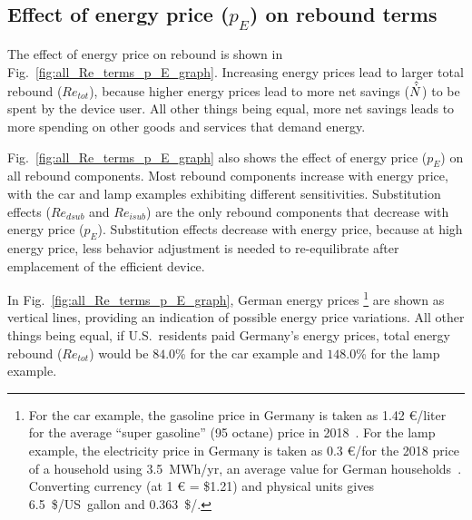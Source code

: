 \documentclass[12pt]{article}\usepackage[]{graphicx}\usepackage[]{xcolor}
\begin{document}
\subsection{Effect of energy price ($p_E$) on rebound terms} 
\label{sec:effect_of_energy_price}




The effect of energy price on rebound is shown in Fig.~\ref{fig:all_Re_terms_p_E_graph}.
Increasing energy prices lead to larger total rebound ($Re_{tot}$),
because higher energy prices lead to more net savings ($\hat{\dot{N}}$)
to be spent by the device user.
All other things being equal, more net savings leads to 
more spending on other goods and services that demand energy.

Fig.~\ref{fig:all_Re_terms_p_E_graph} also 
shows the effect of energy price ($p_E$)
on all rebound components.
Most rebound components increase with energy price, 
with the car and lamp examples exhibiting different sensitivities. 
Substitution effects ($Re_{dsub}$ and $Re_{isub}$)
are the only rebound components that decrease with energy price ($p_E$).
Substitution effects decrease with energy price, because 
at high energy price, less behavior adjustment is needed to re-equilibrate 
after emplacement of the efficient device.



In Fig.~\ref{fig:all_Re_terms_p_E_graph}, German energy prices%
\footnote{
  For the car example,
  the gasoline price in Germany is taken as 1.42 \euro{}/liter for the average ``super gasoline'' (95 octane) 
  price in 2018~\citep{finanzen}.
  For the lamp example,
  the electricity price in Germany is taken as 0.3 \euro{}/\kWhr for the 2018 price of a household using 3.5~MWh/yr,
  an average value for German households~\citep{bundesministerium}.
  Converting currency (at 1 \euro{} = \$1.21) and
  physical units gives 
  6.5~\$/US~gallon and 
  0.363~\$/\kWhr.}
%
are shown as vertical lines,
providing an indication of possible energy price variations.
All other things being equal, 
if U.S.\ residents paid Germany's energy prices,
total energy rebound ($Re_{tot}$) would be 
$84.0$\%
for the car example and 
$148.0$\%
for the lamp example.

\end{document}
